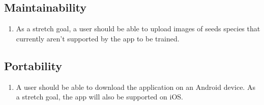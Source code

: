 \documentclass[onecolumn, draftclsnofoot,10pt, compsoc]{IEEEtran}
\begin{document}
\subsection{Maintainability}
\begin{enumerate}
\item
As a stretch goal, a user should be able to upload images of seeds species that currently aren't supported by the app to be trained.
\end{enumerate}
\subsection{Portability}
\begin{enumerate}
\item
A user should be able to download the application on an Android device. As a stretch goal, the app will also be supported on iOS.
\end{enumerate}
\end{document}
